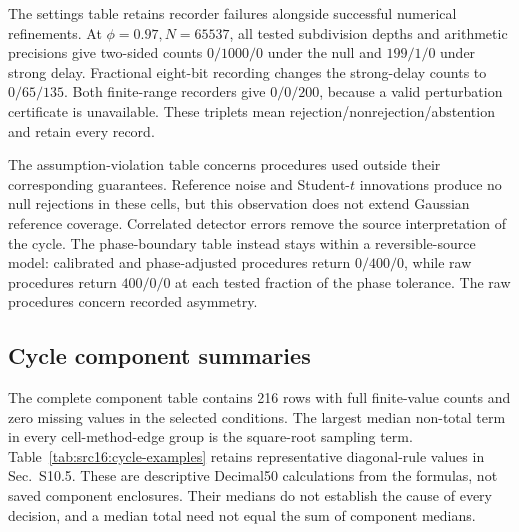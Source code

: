 The settings table retains recorder failures alongside successful numerical refinements. At $\phi=0.97,N=65537$, all tested subdivision depths and arithmetic precisions give two-sided counts $0/1000/0$ under the null and $199/1/0$ under strong delay. Fractional eight-bit recording changes the strong-delay counts to $0/65/135$. Both finite-range recorders give $0/0/200$, because a valid perturbation certificate is unavailable. These triplets mean rejection/nonrejection/abstention and retain every record.

The assumption-violation table concerns procedures used outside their corresponding guarantees. Reference noise and Student-$t$ innovations produce no null rejections in these cells, but this observation does not extend Gaussian reference coverage. Correlated detector errors remove the source interpretation of the cycle. The phase-boundary table instead stays within a reversible-source model: calibrated and phase-adjusted procedures return $0/400/0$, while raw procedures return $400/0/0$ at each tested fraction of the phase tolerance. The raw procedures concern recorded asymmetry.

\subsection{Cycle component summaries}
The complete component table contains 216 rows with full finite-value counts and zero missing values in the selected conditions. The largest median non-total term in every cell-method-edge group is the square-root sampling term. Table~\ref{tab:src16:cycle-examples} retains representative diagonal-rule values in Sec.~S10.5. These are descriptive Decimal50 calculations from the formulas, not saved component enclosures. Their medians do not establish the cause of every decision, and a median total need not equal the sum of component medians.
